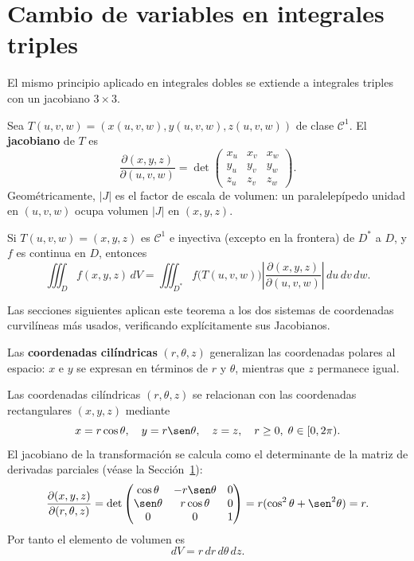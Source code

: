 \section{Cambio de variables en integrales triples}
\label{sec:cambio-var-triples}


El mismo principio aplicado en integrales dobles se extiende a integrales triples con un jacobiano
$3\times3$.

\begin{definition}
Sea $T(u,v,w)=(x(u,v,w),y(u,v,w),z(u,v,w))$ de clase $\mathcal{C}^1$.
El \textbf{jacobiano} de $T$ es
\[
\frac{\partial(x,y,z)}{\partial(u,v,w)}
= \det\begin{pmatrix}
    x_u & x_v & x_w \\
    y_u & y_v & y_w \\
    z_u & z_v & z_w
  \end{pmatrix}.
\]
Geométricamente, $|J|$ es el factor de escala de volumen: un
paralelepípedo unidad en $(u,v,w)$ ocupa volumen $|J|$ en $(x,y,z)$.
\end{definition}

\begin{theorem}
Si $T(u,v,w)=(x,y,z)$ es $\mathcal{C}^1$ e inyectiva (excepto en la
frontera) de $D^*$ a $D$, y $f$ es continua en $D$, entonces
\[
\iiint_D f(x,y,z)\,dV
= \iiint_{D^*} f\bigl(T(u,v,w)\bigr)
  \left|\frac{\partial(x,y,z)}{\partial(u,v,w)}\right|\,du\,dv\,dw.
\]
\end{theorem}

Las secciones siguientes aplican este teorema a los dos sistemas de
coordenadas curvilíneas más usados, verificando explícitamente sus
Jacobianos.


Las \textbf{coordenadas cilíndricas} $(r,\theta,z)$ generalizan las coordenadas polares al espacio: $x$ e $y$ se expresan en términos de $r$ y $\theta$, mientras que $z$ permanece igual.

\begin{definition}
Las coordenadas cilíndricas $(r,\theta,z)$ se relacionan con las coordenadas rectangulares $(x,y,z)$ mediante
\[
x = r\cos\theta,\quad y = r\sen\theta,\quad z = z,
\quad r\ge0,\;\theta\in[0,2\pi).
\]
El jacobiano de la transformación se calcula como el determinante de la
matriz de derivadas parciales (véase la Sección~\ref{sec:cambio-var-triples}):
\[
\frac{\partial(x,y,z)}{\partial(r,\theta,z)}
= \det\begin{pmatrix}
    \cos\theta & -r\sen\theta & 0 \\
    \sen\theta &  r\cos\theta & 0 \\
    0          & 0            & 1
  \end{pmatrix}
= r(\cos^2\theta + \sen^2\theta) = r.
\]
Por tanto el elemento de volumen es
\[
dV = r\,dr\,d\theta\,dz.
\]
\end{definition}

